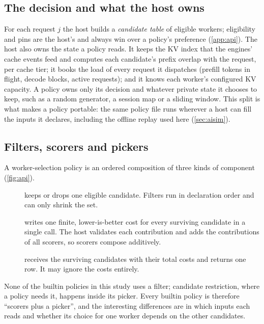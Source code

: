 \subsection{The decision and what the host owns}
\label{sec:api-host}

For each request $j$ the host builds a \emph{candidate table} of eligible workers; eligibility and
pins are the host's and always win over a policy's preference (\cref{app:api}).
The host also owns the state a policy reads. It keeps the KV index that the engines' cache events
feed and computes each candidate's prefix overlap with the request, per cache tier; it books the
load of every request it dispatches (prefill tokens in flight, decode blocks, active requests); and
it knows each worker's configured KV capacity. A policy owns only its decision and whatever private
state it chooses to keep, such as a random generator, a session map or a sliding window. This split
is what makes a policy portable: the same policy file runs wherever a host can fill the inputs it
declares, including the offline replay used here (\cref{sec:aisim}).

\subsection{Filters, scorers and pickers}
\label{sec:api-components}

A worker-selection policy is an ordered composition of three kinds of component
(\cref{fig:api}).
\begin{description}
  \item[] keeps or drops one eligible candidate. Filters run in declaration
    order and can only shrink the set.
  \item[] writes one finite, lower-is-better cost for every surviving candidate
    in a single call. The host validates each contribution and adds the contributions of all
    scorers, so scorers compose additively.
  \item[] receives the surviving candidates with their total costs and returns
    one row. It may ignore the costs entirely.
\end{description}
None of the builtin policies in this study uses a filter; candidate restriction, where a policy
needs it, happens inside its picker. Every builtin policy is therefore ``scorers plus a picker'',
and the interesting differences are in which inputs each reads and whether its choice for one
worker depends on the other candidates.

